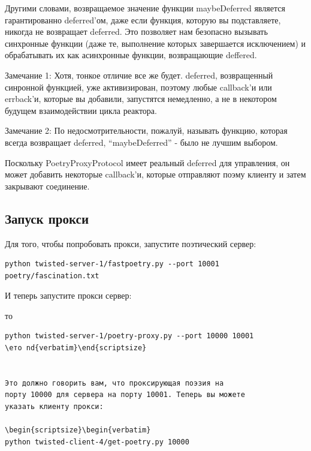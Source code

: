 Другими словами, возвращаемое значение функции maybeDeferred 
является гарантированно deferred'ом, даже если функция, которую 
вы подставляете, никогда не возвращает deferred. Это позволяет 
нам безопасно вызывать синхронные функции (даже те, выполнение 
которых завершается исключением) и обрабатывать их как 
асинхронные функции, возвращающие deffered.


Замечание 1: Хотя, тонкое отличие все же будет. deferred, возвращенный 
синронной функцией, уже активизирован, поэтому любые callback'и или 
errback'и, которые вы добавили, запустятся немедленно, а не в 
некотором будущем взаимодействии цикла реактора.


Замечание 2: По недосмотрительности, пожалуй, называть функцию, 
которая всегда возвращает deferred, ``maybeDeferred'' - было не 
лучшим выбором.


Поскольку PoetryProxyProtocol имеет реальный deferred для 
управления, он может добавить некоторые callback'и, 
которые отправляют поэму клиенту и затем закрывают 
соединение. 


\subsection{Запуск прокси}

Для того, чтобы попробовать прокси, запустите поэтический сервер:

\begin{scriptsize}\begin{verbatim}
python twisted-server-1/fastpoetry.py --port 10001 poetry/fascination.txt
 \end{verbatim}\end{scriptsize}

И теперь запустите прокси сервер:

то \begin{scriptsize}\begin{verbatim}
python twisted-server-1/poetry-proxy.py --port 10000 10001
\eто nd{verbatim}\end{scriptsize}


Это должно говорить вам, что проксирующая поэзия на 
порту 10000 для сервера на порту 10001. Теперь вы можете 
указать клиенту прокси:

\begin{scriptsize}\begin{verbatim}
python twisted-client-4/get-poetry.py 10000
\end{verbatim}\end{scriptsize}



